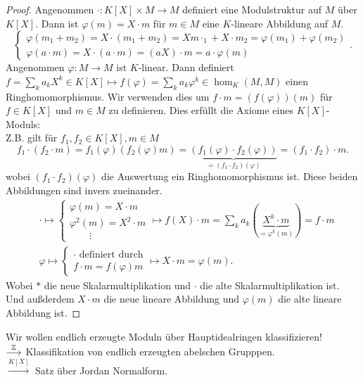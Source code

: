 \begin{proof}
	Angenommen $\cdot : K[X] \times M \to M$ definiert eine Modulstruktur auf $M$ über $K[X]$. Dann ist $\varphi(m) = X \cdot m$ für $m \in M$ eine 
	$K$-lineare Abbildung auf $M$.
	\[
	\begin{cases}
		\varphi(m_1 + m_2) = X \cdot (m_1 + m_2) = X m\cdot _1 + X \cdot m_2 = \varphi(m_1) + \varphi(m_2)\\
		\varphi(a \cdot m) = X \cdot ( a \cdot m) = (a X) \cdot m = a \cdot \varphi(m)
	\end{cases}
	.\] 
	Angenommen $\varphi: M \to M$ ist $K$-linear. Dann definiert $f = \sum_{k} a_{k} X^{k} \in K[X] \mapsto f(\varphi) = \sum_{k} a_{k} \varphi^{k} \in \hom_{K}(M,M)$
	einen Ringhomomorphismus. Wir verwenden dies um $f \cdot m = (f(\varphi))(m)$ für $f \in K[X]$ und $m \in M$ zu definieren.
	Dies erfüllt die Axiome eines $K[X]$-Moduls:\\
	Z.B. gilt für $f_1,f_2 \in K[X], m \in M$
	\[
		f_1 \cdot (f_2 \cdot m) = f_1(\varphi) (f_2(\varphi) m) = \underbrace{(f_1(\varphi) \cdot f_2(\varphi))}_{= (f_1 \cdot f_2)(\varphi)} = (f_1 \cdot f_2) \cdot m
	.\] 
	wobei $(f_1 \cdot f_2)(\varphi)$ die Auswertung ein Ringhomomorphismus ist.
	Diese beiden Abbildungen sind invers zueinander.
	\begin{align*}
		&\cdot \mapsto  \begin{cases}
			\varphi(m) = X \cdot m\\
			\varphi^2(m) = X^2 \cdot m\\
			\qquad \vdots
		\end{cases} \mapsto f(X) \cdot m = \sum_{k} a_{k} ( \underbrace{X^{k} \cdot m}_{= \varphi^{k}(m)}) = f \cdot m\\
		&\varphi \mapsto \begin{cases}
			\cdot \text{ definiert durch}\\
			f \cdot m = f(\varphi) m
		\end{cases} \mapsto X \cdot m = \varphi(m)
	.\end{align*}
	Wobei $*$ die neue Skalarmultiplikation und $\cdot $ die alte Skalarmultiplikation ist.
	Und außderdem $X\cdot m$ die neue lineare Abbildung und $\varphi(m)$ die alte lineare Abbildung ist.
\end{proof}

Wir wollen endlich erzeugte Moduln über Hauptidealringen klassifizieren!\\
$\overset{\mathbb{Z}}{\longrightarrow}$ Klassifikation von endlich erzeugten abelschen Grupppen.\\
$\overset{K[X]}{\longrightarrow}$ Satz über Jordan Normalform.

